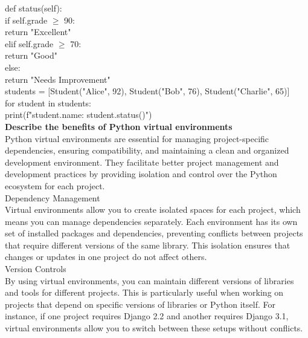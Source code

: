 \documentclass{article}
\begin{document}
	\indent def status(self):\\
		\indent\indent if self.grade $\geq$ 90:\\
			\indent\indent\indent return "Excellent"\\
	
		\indent\indent elif self.grade $\geq$ 70:\\
			\indent\indent\indent return "Good"\\

		\indent\indent else:\\
			\indent\indent\indent return "Needs Improvement"\\

\noindent students = [Student("Alice", 92), Student("Bob", 76), Student("Charlie", 65)]\\

\noindent for student in students:\\
	\indent print(f"{student.name}: {student.status()}")\\

\textbf{Describe the benefits of Python virtual environments}\\

	Python virtual environments are essential for managing project-specific dependencies, ensuring compatibility, and maintaining a clean and organized development environment. They facilitate better project management and development practices by providing isolation and control over the Python ecosystem for each project.\\

\noindent Dependency Management\\

	Virtual environments allow you to create isolated spaces for each project, which means you can manage dependencies separately. Each environment has its own set of installed packages and dependencies, preventing conflicts between projects that require different versions of the same library. This isolation ensures that changes or updates in one project do not affect others.\\

\noindent Version Controls\\

	By using virtual environments, you can maintain different versions of libraries and tools for different projects. This is particularly useful when working on projects that depend on specific versions of libraries or Python itself. For instance, if one project requires Django 2.2 and another requires Django 3.1, virtual environments allow you to switch between these setups without conflicts.\\
\end{document}
